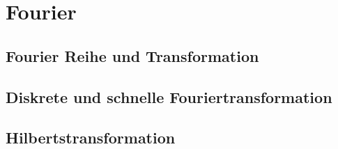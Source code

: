\section{Fourier}
\subsection{Fourier Reihe und Transformation}



\subsection{Diskrete und schnelle Fouriertransformation}
\subsection{Hilbertstransformation}
